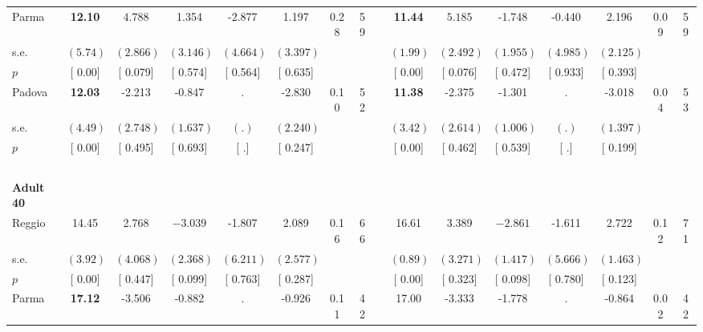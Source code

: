 \begin{longtable}{L{8em} c c c c c c c p{1em} c c c c c c c}
\quad \quad \quad Parma& \textbf{    12.10} & $ \mathbf{    4.788}$ &     1.354 &    -2.877 &     1.197 &      0.28 &        59 & & \textbf{    11.44} & $ \mathbf{    5.185}$ &    -1.748 &    -0.440 &     2.196 &      0.09 &        59  \\*
\quad \quad \quad \quad s.e.& $ (     5.74)$ & $ (    2.866)$ & $ (    3.146)$ & $ (    4.664)$ & $ (    3.397)$ & & & & $ (     1.99)$ & $ (    2.492)$ & $ (    1.955)$ & $ (    4.985)$ & $ (    2.125)$ & &  \\*
\quad \quad \quad \quad $ p$ & [     0.00] & [    0.079] & [    0.574] & [    0.564] & [    0.635] & & & & [     0.00] & [    0.076] & [    0.472] & [    0.933] & [    0.393] & &  \\[1em]
\quad \quad \quad Padova& \textbf{    12.03} &    -2.213 &    -0.847 &         . &    -2.830 &      0.10 &        52 & & \textbf{    11.38} &    -2.375 &    -1.301 &         . &    -3.018 &      0.04 &        53  \\*
\quad \quad \quad \quad s.e.& $ (     4.49)$ & $ (    2.748)$ & $ (    1.637)$ & $ (        .)$ & $ (    2.240)$ & & & & $ (     3.42)$ & $ (    2.614)$ & $ (    1.006)$ & $ (        .)$ & $ (    1.397)$ & &  \\*
\quad \quad \quad \quad $ p$ & [     0.00] & [    0.495] & [    0.693] & [        .] & [    0.247] & & & & [     0.00] & [    0.462] & [    0.539] & [        .] & [    0.199] & &  \\[1em]
~\\[1em]
\quad \quad \textbf{Adult 40} & & & & & & & & & & & & & & & \\* 
\quad \quad \quad Reggio& 14.45 &     2.768 & $ \mathbf{   -3.039}$ &    -1.807 &     2.089 &      0.16 &        66 & & 16.61 &     3.389 & $ \mathbf{   -2.861}$ &    -1.611 &     2.722 &      0.12 &        71  \\*
\quad \quad \quad \quad s.e.& $ (     3.92)$ & $ (    4.068)$ & $ (    2.368)$ & $ (    6.211)$ & $ (    2.577)$ & & & & $ (     0.89)$ & $ (    3.271)$ & $ (    1.417)$ & $ (    5.666)$ & $ (    1.463)$ & &  \\*
\quad \quad \quad \quad $ p$ & [     0.00] & [    0.447] & [    0.099] & [    0.763] & [    0.287] & & & & [     0.00] & [    0.323] & [    0.098] & [    0.780] & [    0.123] & &  \\[1em]
\quad \quad \quad Parma& \textbf{    17.12} &    -3.506 &    -0.882 &         . &    -0.926 &      0.11 &        42 & & 17.00 &    -3.333 &    -1.778 &         . &    -0.864 &      0.02 &        42  \\*

\end{longtable}
